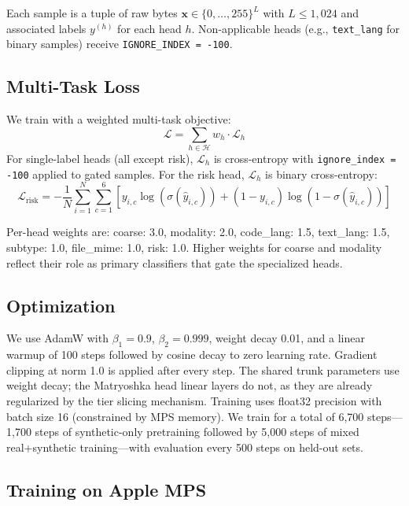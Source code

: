 \documentclass[11pt,a4paper]{article}
\begin{document}
Each sample is a tuple of raw bytes $\mathbf{x} \in \{0,\dots,255\}^L$ with $L \leq 1{,}024$ and associated labels $y^{(h)}$ for each head $h$.
Non-applicable heads (e.g., \texttt{text\_lang} for binary samples) receive \texttt{IGNORE\_INDEX = -100}.

\subsection{Multi-Task Loss}

We train with a weighted multi-task objective:
\begin{equation}
\mathcal{L} = \sum_{h \in \mathcal{H}} w_h \cdot \mathcal{L}_h
\end{equation}
For single-label heads (all except risk), $\mathcal{L}_h$ is cross-entropy with \texttt{ignore\_index = -100} applied to gated samples.
For the risk head, $\mathcal{L}_h$ is binary cross-entropy:
\begin{equation}
\mathcal{L}_{\text{risk}} = -\frac{1}{N}\sum_{i=1}^N \sum_{c=1}^{6} \left[ y_{i,c} \log(\sigma(\hat{y}_{i,c})) + (1-y_{i,c}) \log(1-\sigma(\hat{y}_{i,c})) \right]
\end{equation}

Per-head weights are: coarse: 3.0, modality: 2.0, code\_lang: 1.5, text\_lang: 1.5, subtype: 1.0, file\_mime: 1.0, risk: 1.0.
Higher weights for coarse and modality reflect their role as primary classifiers that gate the specialized heads.

\subsection{Optimization}

We use AdamW with $\beta_1=0.9$, $\beta_2=0.999$, weight decay 0.01, and a linear warmup of 100 steps followed by cosine decay to zero learning rate.
Gradient clipping at norm 1.0 is applied after every step.
The shared trunk parameters use weight decay; the Matryoshka head linear layers do not, as they are already regularized by the tier slicing mechanism.
Training uses float32 precision with batch size 16 (constrained by MPS memory).
We train for a total of 6{,}700 steps---1{,}700 steps of synthetic-only pretraining followed by 5{,}000 steps of mixed real+synthetic training---with evaluation every 500 steps on held-out sets.

\subsection{Training on Apple MPS}
\end{document}
